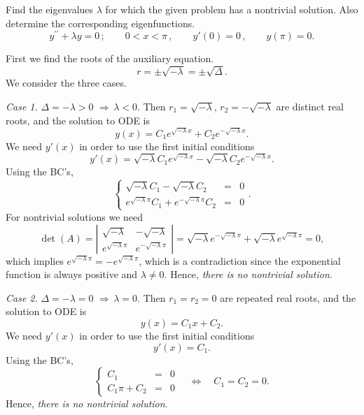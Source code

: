\documentclass[11pt]{article}
\begin{document}
\begin{problem}
 Find the eigenvalues $\lambda$ for which the given problem has a nontrivial solution. Also determine the corresponding eigenfunctions.
\begin{equation*}
y^{\prime \prime} + \lambda y =0\,; \qquad  0<x<\pi \,, \qquad y'(0)=0  \,,\qquad y(\pi) =0. 
\end{equation*}
\end{problem}
\begin{solution}
First we find the roots of the auxiliary equation.
\[r=\pm\sqrt{-\lambda}=\pm\sqrt{\Delta}.\]
We consider the three cases.

\par \textsl{Case 1.} $\Delta = -\lambda >0 \,\, \Rightarrow \, \lambda<0.$ Then $r_{1}=\sqrt{-\lambda}$, $r_{2}=-\sqrt{-\lambda}$ are distinct real roots, and the solution to ODE is
\[y(x)=C_{1}e^{\sqrt{-\lambda}x}+C_{2}e^{-\sqrt{-\lambda}x}.\]
We need $y'(x)$ in order to use the first initial conditions
\[y'(x)=\sqrt{-\lambda}C_{1}e^{\sqrt{-\lambda}x}-\sqrt{-\lambda}C_{2}e^{-\sqrt{-\lambda}x}.\]
Using the BC's,
\begin{equation*}
\left\{\begin{array}{rcl}
        \sqrt{-\lambda}C_{1} - \sqrt{-\lambda}C_{2}&=&0\\
       e^{\sqrt{-\lambda}\pi}C_{1} +e^{-\sqrt{-\lambda}\pi}C_{2}&=&0
      \end{array}\right. .
\end{equation*}
For nontrivial solutions we need 
$$\det(A)=\left|\begin{matrix}\sqrt{-\lambda} & -\sqrt{-\lambda} \\ e^{\sqrt{-\lambda}\pi} & e^{-\sqrt{-\lambda}\pi}\end{matrix}\right|=\sqrt{-\lambda}e^{-\sqrt{-\lambda}\pi}+\sqrt{-\lambda}e^{\sqrt{-\lambda}\pi}=0,$$ 
which implies $e^{\sqrt{-\lambda}\pi}=-e^{\sqrt{-\lambda}\pi}$, which is a contradiction since the exponential function is always positive and $\lambda\neq 0$. Hence, \textsl{there is no nontrivial solution}.

\par \textsl{Case 2.} $\Delta = -\lambda =0 \,\, \Rightarrow \, \lambda=0.$ Then $r_{1}=r_{2}=0$ are repeated real roots, and the solution to ODE is
\[y(x)=C_{1}x+C_{2}.\]
We need $y'(x)$ in order to use the first initial conditions
\[y'(x)=C_{1}.\]
Using the BC's,
\begin{equation*}
\left\{\begin{array}{rcl}
       C_{1} & = &0\\
       C_{1}\pi+C_{2} & = &0
      \end{array}\right. \quad \Leftrightarrow \quad C_{1}=C_{2}=0.
\end{equation*}
Hence, \textsl{there is no nontrivial solution}.


\end{solution}
\end{document}
